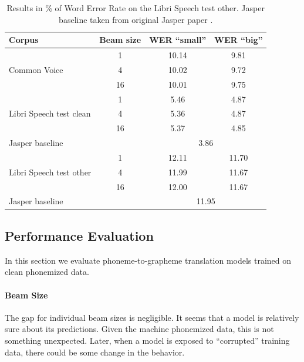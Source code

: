 \begin{table}[H]
	\centering
	\begin{tabular}{lc|cc}
		\bf Corpus & \bf Beam size & \bf WER ``small''& \bf WER ``big'' \\
		\hline
		\multirow{3}{*}{Common Voice}    & 1    &10.14    &    9.81    \\
		& 4    & 10.02    &    9.72    \\
		& 16    &10.01    & 9.75    \\
		\hline
		
		\multirow{3}{*}{Libri Speech test clean}    & 1    &    5.46 &    4.87    \\
		& 4    &  5.36 &    4.87    \\
		& 16     &5.37    & 4.85    \\
		\multicolumn{2}{l|}{Jasper baseline} & \multicolumn{2}{c}{3.86} \\
		\hline
		
		\multirow{3}{*}{Libri Speech test other}    & 1    &    12.11 &11.70    \\
		& 4    &11.99     &    11.67    \\
		& 16    & 12.00     & 11.67    \\
		\multicolumn{2}{l|}{Jasper baseline} & \multicolumn{2}{c}{11.95} \\
		
	\end{tabular}
	
	\caption{Results in \% of Word Error Rate on the Libri Speech test other. Jasper baseline taken from original Jasper paper .}
	\label{tab:phon_en}
\end{table}


\subsection{Performance Evaluation}
In this section we evaluate phoneme-to-grapheme translation models trained on clean phonemized data.

\paragraph{Beam Size} The gap for individual beam sizes is negligible. It seems that a model is relatively sure about its predictions. Given the machine phonemized data, this is not something unexpected. Later, when a model is exposed to ``corrupted'' training data, there could be some change in the behavior.

